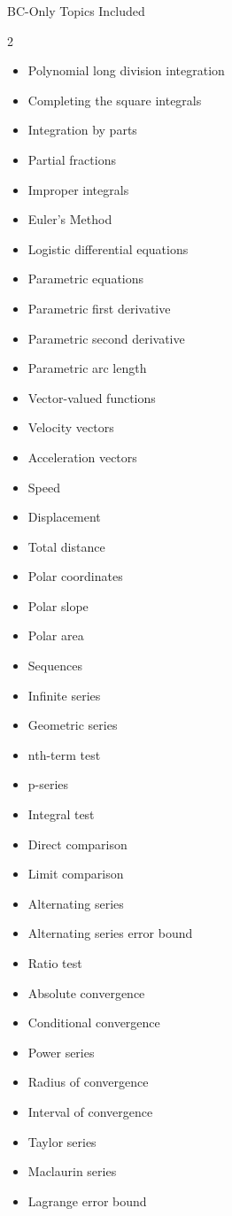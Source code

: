 \documentclass[11pt]{article}
\begin{document}
\begin{unitbox}{BC-Only Topics Included}
\begin{multicols}{2}
\begin{itemize}[leftmargin=1.2em]
\item Polynomial long division integration
\item Completing the square integrals
\item Integration by parts
\item Partial fractions
\item Improper integrals
\item Euler's Method
\item Logistic differential equations
\item Parametric equations
\item Parametric first derivative
\item Parametric second derivative
\item Parametric arc length
\item Vector-valued functions
\item Velocity vectors
\item Acceleration vectors
\item Speed
\item Displacement
\item Total distance
\item Polar coordinates
\item Polar slope
\item Polar area
\item Sequences
\item Infinite series
\item Geometric series
\item nth-term test
\item p-series
\item Integral test
\item Direct comparison
\item Limit comparison
\item Alternating series
\item Alternating series error bound
\item Ratio test
\item Absolute convergence
\item Conditional convergence
\item Power series
\item Radius of convergence
\item Interval of convergence
\item Taylor series
\item Maclaurin series
\item Lagrange error bound
\end{itemize}
\end{multicols}
\end{unitbox}
\end{document}
